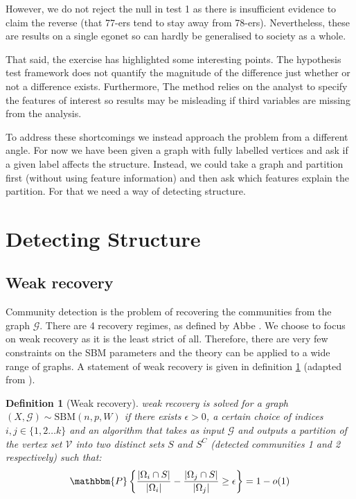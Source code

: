 \documentclass[]{article}
\newcommand{\Gcal}{\mathcal{G}}
\newcommand{\Vcal}{\mathcal{V}}
\newcommand{\prob}{\mathbbm{P}}
\newtheorem{definition}{Definition}[section]
\begin{document}
\begin{multicols*}{2}
However, we do not reject the null in test 1 as there is insufficient evidence to claim the reverse (that 77-ers tend to stay away from 78-ers). Nevertheless, these are results on a single egonet so can hardly be generalised to society as a whole.

That said, the exercise has highlighted some interesting points. The hypothesis test framework does not quantify the magnitude of the difference just whether or not a difference exists. Furthermore, The method relies on the analyst to specify the features of interest so results may be misleading if third variables are missing from the analysis.

To address these shortcomings we instead approach the problem from a different angle. For now we have been given a graph with fully labelled vertices and ask if a given label affects the structure. Instead, we could take a graph and partition first (without using feature information) and then ask which features explain the partition. For that we need a way of detecting structure.

\section{Detecting Structure}
\subsection{Weak recovery}

Community detection is the problem of recovering the communities from the graph $\Gcal$. There are 4 recovery regimes, as defined by Abbe \cite{Abbe}. We choose to focus on weak recovery as it is the least strict of all. Therefore, there are very few constraints on the SBM parameters and the theory can be applied to a wide range of graphs. A statement of weak recovery is given in definition \ref{defn:weak-recovery} (adapted from \cite{Abbe}).

\begin{definition}[Weak recovery]
	\label{defn:weak-recovery}
	weak recovery is solved for a graph  $(X, \Gcal) \sim \textrm{SBM}(n, p, W)$ if there exists $\epsilon > 0$, a certain choice of indices $i, j \in \{1, 2 \dots k\}$ and an algorithm that takes as input $\Gcal$ and outputs a partition of the vertex set $\Vcal$ into two distinct sets $S$ and $S^C$ (detected communities 1 and 2 respectively) such that:
	\begin{equation*}
		\prob \left\{ \frac{|\Omega_i \cap S|}{|\Omega_i|} - \frac{|\Omega_j \cap S|}{|\Omega_j|} \geq \epsilon \right\} = 1 - o(1)
	\end{equation*}


\end{definition}
\end{multicols*}
\end{document}
